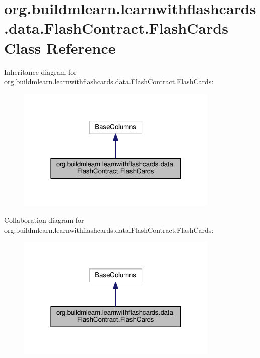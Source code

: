 \hypertarget{classorg_1_1buildmlearn_1_1learnwithflashcards_1_1data_1_1FlashContract_1_1FlashCards}{}\section{org.\+buildmlearn.\+learnwithflashcards.\+data.\+Flash\+Contract.\+Flash\+Cards Class Reference}
\label{classorg_1_1buildmlearn_1_1learnwithflashcards_1_1data_1_1FlashContract_1_1FlashCards}


Inheritance diagram for org.\+buildmlearn.\+learnwithflashcards.\+data.\+Flash\+Contract.\+Flash\+Cards\+:
\nopagebreak
\begin{figure}[H]
\begin{center}
\leavevmode
\includegraphics[width=274pt]{classorg_1_1buildmlearn_1_1learnwithflashcards_1_1data_1_1FlashContract_1_1FlashCards__inherit__graph}
\end{center}
\end{figure}


Collaboration diagram for org.\+buildmlearn.\+learnwithflashcards.\+data.\+Flash\+Contract.\+Flash\+Cards\+:
\nopagebreak
\begin{figure}[H]
\begin{center}
\leavevmode
\includegraphics[width=274pt]{classorg_1_1buildmlearn_1_1learnwithflashcards_1_1data_1_1FlashContract_1_1FlashCards__coll__graph}
\end{center}
\end{figure}
